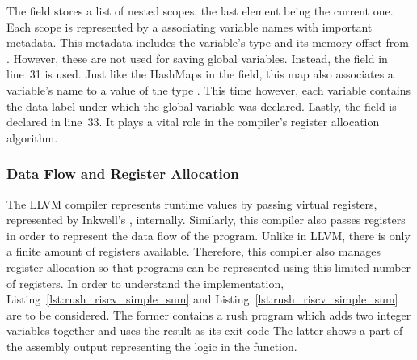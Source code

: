The  field stores a list of nested scopes, the last element being the current one.
Each scope is represented by a  associating variable names with important metadata.
This metadata includes the variable's type and its memory offset from .
However, these  are not used for saving global variables.
Instead, the  field in line~31 is used.
Just like the HashMaps in the  field, this map also associates a variable's name to a value of the type .
This time however, each variable contains the data label under which the global variable was declared.
Lastly, the  field is declared in line~33.
It plays a vital role in the compiler's register allocation algorithm.

\subsubsection{Data Flow and Register Allocation}

The LLVM compiler represents runtime values by passing virtual registers, represented by Inkwell's , internally.
Similarly, this compiler also passes registers in order to represent the data flow of the program.
Unlike in LLVM, there is only a finite amount of registers available.
Therefore, this compiler also manages register allocation so that programs can be represented using this limited number of registers.
In order to understand the implementation, Listing~\ref{lst:rush_riscv_simple_sum} and Listing~\ref{lst:rush_riscv_simple_sum} are to be considered.
The former contains a rush program which adds two integer variables together and uses the result as its exit code
The latter shows a part of the assembly output representing the logic in the  function.

\noindent
\begin{minipage}{.45\textwidth}
	\centering
\end{minipage}%
\hfill%
\begin{minipage}{.45\textwidth}
	\centering
	\vspace{.1cm}
\end{minipage}

